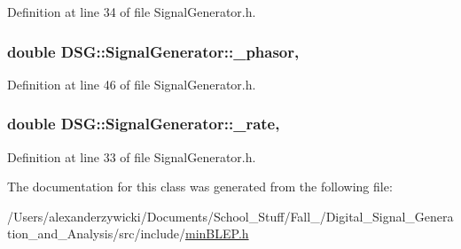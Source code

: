 Definition at line 34 of file Signal\+Generator.\+h.

\hypertarget{classDSG_1_1SignalGenerator_ac2271b582bf699275f077ecb642a8cd9}{
\subsubsection[{\+\_\+phasor}]{\setlength{\rightskip}{0pt plus 5cm}double D\+S\+G\+::\+Signal\+Generator\+::\+\_\+phasor\hspace{0.3cm}{\ttfamily [protected]}, {\ttfamily [inherited]}}}\label{classDSG_1_1SignalGenerator_ac2271b582bf699275f077ecb642a8cd9}


Definition at line 46 of file Signal\+Generator.\+h.

\hypertarget{classDSG_1_1SignalGenerator_aa10f6c85d9adee901139ea7fb346f39d}{
\subsubsection[{\+\_\+rate}]{\setlength{\rightskip}{0pt plus 5cm}double D\+S\+G\+::\+Signal\+Generator\+::\+\_\+rate\hspace{0.3cm}{\ttfamily [protected]}, {\ttfamily [inherited]}}}\label{classDSG_1_1SignalGenerator_aa10f6c85d9adee901139ea7fb346f39d}


Definition at line 33 of file Signal\+Generator.\+h.



The documentation for this class was generated from the following file\+:\begin{DoxyCompactItemize}
\item 
/\+Users/alexanderzywicki/\+Documents/\+School\+\_\+\+Stuff/\+Fall\+\_/\+Digital\+\_\+\+Signal\+\_\+\+Generation\+\_\+and\+\_\+\+Analysis/src/include/\hyperlink{minBLEP_8h}{min\+B\+L\+E\+P.\+h}\end{DoxyCompactItemize}

